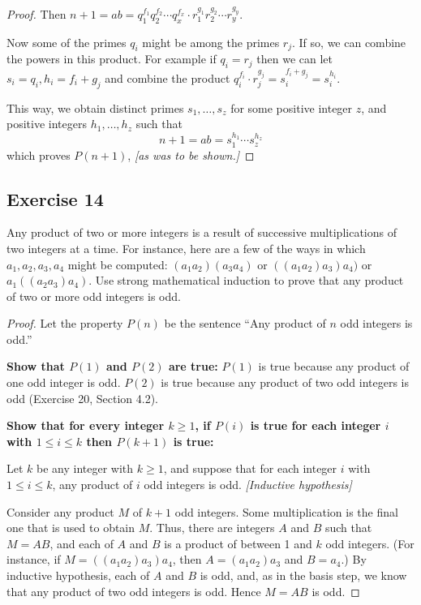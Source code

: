 \documentclass[14pt]{extarticle}
\begin{document}
\begin{proof}
Then $n+1 = ab = q_1^{f_1} q_2^{f_2} \cdots q_x^{f_x} \cdot r_1^{g_1} r_2^{g_2} \cdots r_y^{g_y}$. 

Now some of the primes $q_i$ might be among the primes $r_j$. If so, we can combine the powers in this product. For example if $q_i = r_j$ then we can let $s_i = q_i, h_i = f_i + g_j$ and combine the product $q_i^{f_i} \cdot r_j^{g_j} = s_i^{f_i + g_j} = s_i^{h_i}$. 

This way, we obtain distinct primes $s_1, \ldots, s_z$ for some positive integer $z$, and positive integers $h_1, \ldots, h_z$ such that
\[
n+1 = ab = s_1^{h_1} \cdots s_z^{h_z}
\]
which proves $P(n+1)$, {\it [as was to be shown.]}
\end{proof}

\subsection{Exercise 14}
Any product of two or more integers is a result of successive multiplications of two integers at a time. For instance, here are a few of the ways in which $a_1, a_2, a_3, a_4$ might be computed: $(a_1 a_2)(a_3 a_4)$ or $((a_1 a_2) a_3) a_4)$ or $a_1((a_2 a_3) a_4)$. Use strong mathematical induction to prove that any product of two or more odd integers is odd.

\begin{proof}
Let the property $P(n)$ be the sentence “Any product of $n$ odd integers is odd.”

{\bf Show that $P(1)$ and $P(2)$ are true:}
$P(1)$ is true because any product of one odd integer is odd. 
$P(2)$ is true because any product of two odd integers is odd (Exercise 20, Section 4.2).

{\bf Show that for every integer $k \geq 1$, if $P(i)$ is true for each integer $i$ with $1 \leq i \leq k$ then $P(k + 1)$ is true:}

Let $k$ be any integer with $k \geq 1$, and suppose that
for each integer $i$ with $1 \leq i \leq k$, any product 
of $i$ odd integers is odd. {\it [Inductive hypothesis]} 

Consider any product $M$ of $k + 1$ odd integers. 
Some multiplication is the final one that is used to obtain $M$. 
Thus, there are integers $A$ and $B$ such that $M = AB$, 
and each of $A$ and $B$ is a product of between 1 and $k$ 
odd integers. 
(For instance, if $M = ((a_1a_2)a_3)a_4$, then $A = (a_1a_2)a_3$ and $B = a_4$.) 
By inductive hypothesis, each of $A$ and $B$ is odd, and, 
as in the basis step, we know that any product of two odd
integers is odd. Hence $M = AB$ is odd.
\end{proof}
\end{document}
